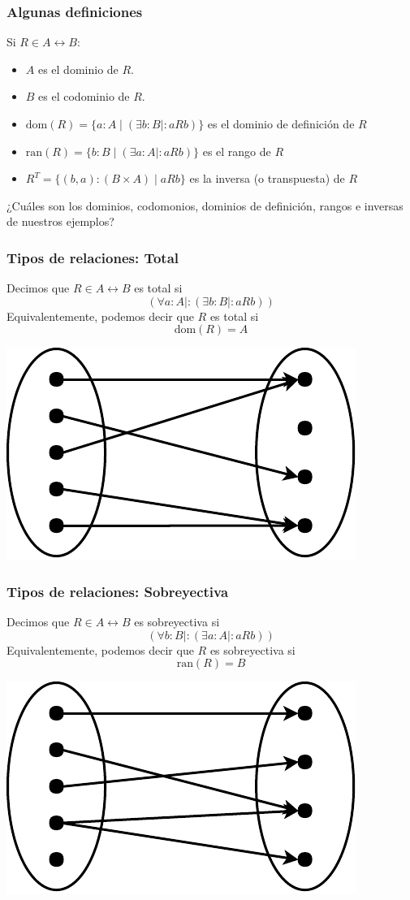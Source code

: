 \documentclass{beamer}
\begin{document}
\begin{frame}[fragile]
    \frametitle{Algunas definiciones}
    Si $R \in A \leftrightarrow B$:
    \begin{itemize}
        \item $A$ es el dominio de $R$.
        \item $B$ es el codominio de $R$.
        \item $\text{dom}(R) = \{a : A \mid (\exists b: B \mid : aRb)\}$ es el dominio de definición de $R$
        \item $\text{ran}(R) = \{b : B \mid (\exists a: A \mid : aRb)\}$ es el rango de $R$
        \item $R^T = \{(b, a) : (B \times A) \mid aRb\}$ es la inversa (o transpuesta) de $R$
    \end{itemize}
    \begin{center}
        ¿Cuáles son los dominios, codomonios, dominios de definición, rangos e inversas de nuestros ejemplos?
    \end{center}
\end{frame}

\begin{frame}[fragile]
    \frametitle{Tipos de relaciones: Total}
    Decimos que $R \in A \leftrightarrow B$ es total si
    $$(\forall a:A \mid : (\exists b:B \mid : aRb))$$
    Equivalentemente, podemos decir que $R$ es total si 
    $$\text{dom}(R) = A$$
    \begin{center}
        \includegraphics[width=0.5\linewidth]{images/total.pdf}
    \end{center}
\end{frame}

\begin{frame}[fragile]
    \frametitle{Tipos de relaciones: Sobreyectiva}
    Decimos que $R \in A \leftrightarrow B$ es sobreyectiva si
    $$(\forall b:B \mid : (\exists a:A \mid : aRb))$$
    Equivalentemente, podemos decir que $R$ es sobreyectiva si 
    $$\text{ran}(R) = B$$
    \begin{center}
        \includegraphics[width=0.5\linewidth]{images/surjective.pdf}
    \end{center}
\end{frame}
\end{document}

